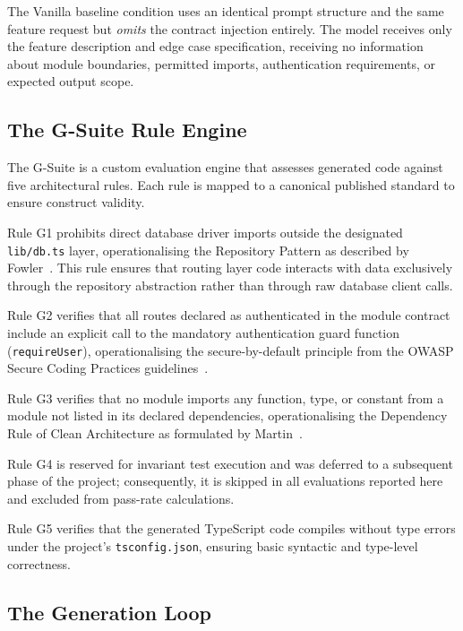 \documentclass[review,12pt,3p]{elsarticle}
\begin{document}
The Vanilla baseline condition uses an identical prompt structure and the same feature
request but \emph{omits} the contract injection entirely. The model receives only the
feature description and edge case specification, receiving no information about module
boundaries, permitted imports, authentication requirements, or expected output scope.

\subsection{The G-Suite Rule Engine}

The G-Suite is a custom evaluation engine that assesses generated code against five
architectural rules. Each rule is mapped to a canonical published standard to ensure
construct validity.

Rule G1 prohibits direct database driver imports outside the designated \texttt{lib/db.ts}
layer, operationalising the Repository Pattern as described by Fowler~\citep{Fowler2002PEAA}.
This rule ensures that routing layer code interacts with data exclusively through the
repository abstraction rather than through raw database client calls.

Rule G2 verifies that all routes declared as authenticated in the module contract include
an explicit call to the mandatory authentication guard function (\texttt{requireUser}),
operationalising the secure-by-default principle from the OWASP Secure Coding Practices
guidelines~\citep{OWASP2023Secure}.

Rule G3 verifies that no module imports any function, type, or constant from a module not
listed in its declared dependencies, operationalising the Dependency Rule of Clean
Architecture as formulated by Martin~\citep{Martin2017CleanArch}.

Rule G4 is reserved for invariant test execution and was deferred to a subsequent phase of
the project; consequently, it is skipped in all evaluations reported here and excluded from
pass-rate calculations.

Rule G5 verifies that the generated TypeScript code compiles without type errors under the
project's \texttt{tsconfig.json}, ensuring basic syntactic and type-level correctness.

\subsection{The Generation Loop}
\end{document}
